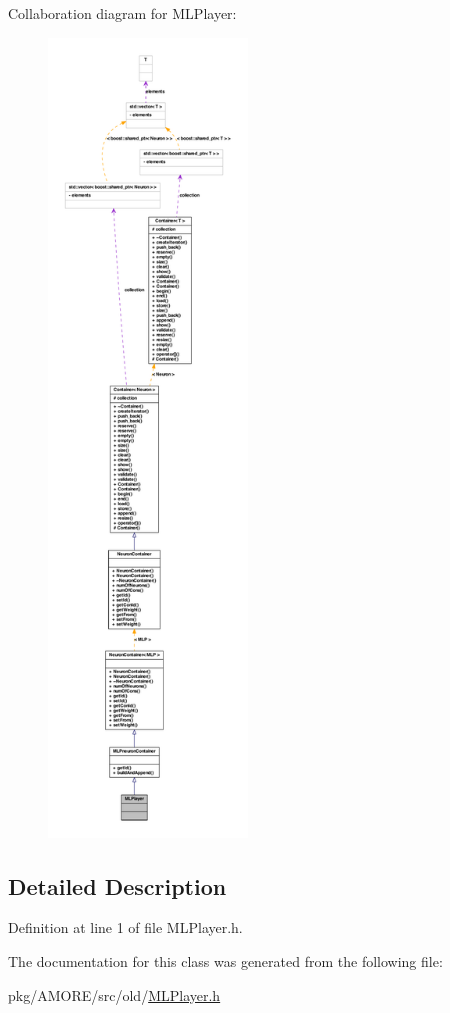 Collaboration diagram for MLPlayer:\nopagebreak
\begin{figure}[H]
\begin{center}
\leavevmode
\includegraphics[height=600pt]{class_m_l_player__coll__graph}
\end{center}
\end{figure}


\subsection{Detailed Description}


Definition at line 1 of file MLPlayer.h.



The documentation for this class was generated from the following file:\begin{DoxyCompactItemize}
\item 
pkg/AMORE/src/old/\hyperlink{_m_l_player_8h}{MLPlayer.h}\end{DoxyCompactItemize}
